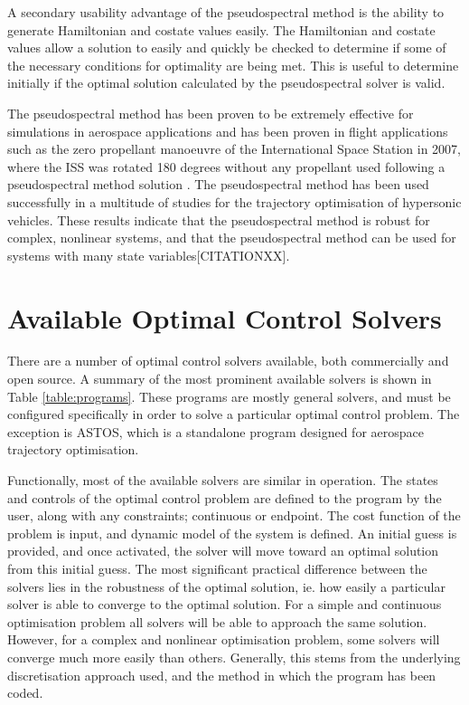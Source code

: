 A secondary usability advantage of the pseudospectral method is the ability to generate Hamiltonian and costate values easily\cite{Gong2010,Fahroo2001,Rao2009}. The Hamiltonian and costate values allow a solution to easily and quickly be checked to determine if some of the necessary conditions for optimality are being met. This is useful to determine initially if the optimal solution calculated by the pseudospectral solver is valid.


The pseudospectral method has been proven to be extremely effective for simulations in aerospace applications and has been proven in flight applications such as the zero propellant manoeuvre of the International Space Station in 2007, where the ISS was rotated 180 degrees without any propellant used following a pseudospectral method solution \cite{Bedrossian}. 
The pseudospectral method has been used successfully in a multitude of studies for the trajectory optimisation of hypersonic vehicles\cite{Li2012,Josselyn2002a,Zhao2013,Tian2011,Darby2011,Chai2015,Rizvi2015,Moshman2014,Yang2017,Kodera2014}. 
These results indicate that the pseudospectral method is robust for complex, nonlinear systems, and that the pseudospectral method can be used for systems with many state variables[CITATIONXX].


\section{Available Optimal Control Solvers}

There are a number of optimal control solvers available, both commercially and open source. A summary of the most prominent available solvers is shown in Table \ref{table:programs}. These programs are mostly general solvers, and must be configured specifically in order to solve a particular optimal control problem. The exception is ASTOS, which is a standalone program designed for aerospace trajectory optimisation.


Functionally, most of the available solvers are similar in operation. The states and controls of the optimal control problem are defined to the program by the user, along with any constraints; continuous or endpoint. The cost function of the problem is input, and dynamic model of the system is defined. An initial guess is provided, and once activated, the solver will move toward an optimal solution from this initial guess. 
The most significant practical difference between the solvers lies in the robustness of the optimal solution, ie. how easily a particular solver is able to converge to the optimal solution. For a simple and continuous optimisation problem all solvers will be able to approach the same solution. However, for a complex and nonlinear optimisation problem, some solvers will converge much more easily than others. Generally, this stems from the underlying discretisation approach used, and the method in which the program has been coded. 


